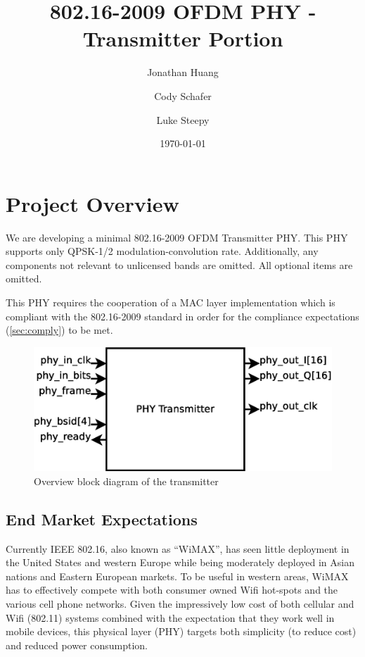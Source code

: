 \documentclass[dvips,10pt,twocolumn]{article}
\title{802.16-2009 OFDM PHY - Transmitter Portion}
\author{Jonathan Huang \and Cody Schafer \and Luke Steepy}
\date{\today}
\begin{document}
\maketitle

\section{Project Overview}
We are developing a minimal 802.16-2009 OFDM Transmitter PHY.  This PHY
supports only QPSK-1/2 modulation-convolution rate. Additionally, any
components not relevant to unlicensed bands are omitted.  All optional items
are omitted.

This PHY requires the cooperation of a MAC layer implementation which is
compliant with the 802.16-2009 standard in order for the compliance
expectations (\autoref{sec:comply}) to be met.

\begin{figure}
\includegraphics[width=\linewidth]{t_block.eps}
\caption{Overview block diagram of the transmitter}
\end{figure}


	\subsection{End Market Expectations}
	Currently IEEE 802.16, also known as ``WiMAX'', has seen little
	deployment in the United States and western Europe while being
	moderately deployed in Asian nations and Eastern European markets.
	To be useful in western areas, WiMAX has to effectively compete
	with both consumer owned Wifi hot-spots and the various cell phone
	networks. Given the impressively low cost of both cellular and Wifi
	(802.11) systems combined with the expectation that they work well
	in mobile devices, this physical layer (PHY) targets both
	simplicity (to reduce cost) and reduced power consumption.
\end{document}
